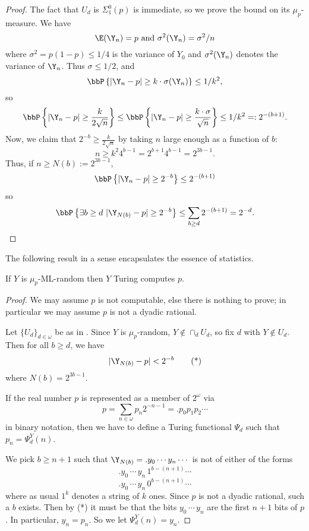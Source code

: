 \begin{proof}%
The fact that $U_d$ is $\Sigma^0_1(p)$ is immediate, so we prove the bound on its $\mu_p$-measure. We have 
\[
\E(\Y_n) = p \text{ and }\sigma^2(\Y_n) = \sigma^2/n
\]
where $\sigma^2=p(1-p)\le 1/4$ is the variance of $Y_0$ and $\sigma^2(\Y_n)$ denotes the variance of $\Y_n$. Thus $\sigma\le 1/2$, and
\[
\bbP\left\{|\Y_n-p|\ge k\cdot\sigma(\Y_n)\right\} \le 1/k^2,
\]
so 
\[
\bbP\left\{|\Y_n-p|\ge \frac{k}{2\sqrt{n}}\right\} \le
\bbP\left\{|\Y_n-p|\ge \frac{k\cdot\sigma}{\sqrt{n}}\right\} \le 1/k^2 =: 2^{-(b+1)}.
\]
Now, we claim that $2^{-b}\ge\frac{k}{2\sqrt{n}}$ by taking $n$ large enough as a function of $b$:
\[
n\ge k^2 4^{b-1}=2^{b+1}4^{b-1}=2^{3b-1}.
\]
Thus, if $n\ge N(b):=2^{3b-1}$, 
\[
\bbP\left\{|\Y_n-p|\ge 2^{-b}\right\} \le 2^{-(b+1)}
\]
so
\[
\bbP\left\{\exists b\ge d\,\,|\Y_{N(b)}-p|\ge 2^{-b}\right\} \le \sum_{b\ge d} 2^{-(b+1)}=2^{-d}.
\]
\end{proof}

The following result in a sense encapsulates the essence of statistics.

\begin{theorem}\label{random_computes} %
	If $Y$ is $\mu_p$-ML-random then $Y$ Turing computes $p$. 
\end{theorem}
\begin{proof}
We may assume $p$ is not computable, else there is nothing to prove; in particular we may assume $p$ is not a dyadic rational.

Let $\{U_d\}_{d\in\omega}$ be as in . Since $Y$ is $\mu_p$-random, $Y\not\in\cap_d U_d$, so fix $d$ with $Y\not\in U_d$. Then for all $b\ge d$, we have
\[
|\Y_{N(b)}-p|< 2^{-b} \tag{*}
\]
where $N(b)=2^{3b-1}$. 

If the real number $p$ is represented as a member of $2^\omega$ via
\[
p = \sum_{n\in\omega} p_n 2^{-n-1} = .p_0 p_1 p_2\cdots
\]
in binary notation, then we have to define a Turing functional $\Psi_d$ such that $p_n=\Psi_d^Y(n)$.

We pick $b\ge n+1$ such that $\Y_{N(b)}=.y_0\cdots y_n\cdots$ is not of either of the forms
\[
.y_0\,\cdots \,y_{n} \,1^{b-(n+1)} \cdots
\]
\[
.y_0\,\cdots \,y_{n} \,0^{b-(n+1)} \cdots
\]
where as usual $1^k$ denotes a string of $k$ ones.
Since $p$ is not a dyadic rational, such a $b$ exists. Then by (*) it must be that the bits $y_0\,\cdots\,y_{n}$ are the first $n+1$ bits of $p$. In particular, $y_n=p_n$. So we let $\Psi_d^Y(n)=y_n$.
\end{proof}


